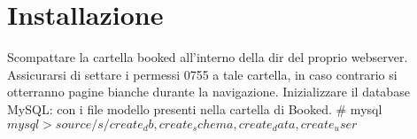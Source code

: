 \chapter{Installazione}
Scompattare la cartella booked all'interno della dir del proprio webserver.
Assicurarsi di settare i permessi 0755 a tale cartella, in caso contrario si otterranno
pagine bianche durante la navigazione.
Inizializzare il database MySQL: con i file modello presenti nella cartella di Booked.
\# mysql 
$mysql > source /s/create_db,create_schema,create_data,create_user$
